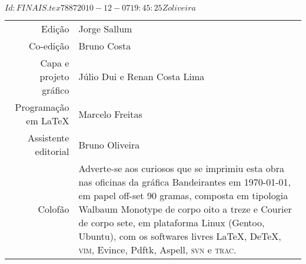 \SVN $Id: FINAIS.tex 7887 2010-12-07 19:45:25Z oliveira $


\newcommand{\putline}[2]{#1 & #2\\}

%
\ifodd\thepage\paginabranca\else\clearpage\fi
\pagebreak

\noindent\begin{tabular}{rp{}}
\small
\putline{Edição}{Jorge Sallum}
		\putline{Co-edição}{Bruno Costa}
		\putline{Capa e projeto gráfico}{Júlio Dui e Renan Costa Lima}
		\putline{Programação em LaTeX}{Marcelo Freitas}
		\putline{Assistente editorial}{Bruno Oliveira}
		\putline{Colofão}{Adverte-se aos curiosos que se
			imprimiu esta obra nas oficinas da gráfica
			Bandeirantes em \today, em papel 
			\mbox{off-set} 90 gramas,
			composta em tipologia Walbaum Monotype de 
			corpo oito a treze e Courier de corpo sete, 
			em plataforma Linux (Gentoo, Ubuntu), 
			com os softwares livres 
			\LaTeX, De\TeX, \textsc{vim}, Evince, Pdftk, 
			Aspell, \textsc{svn} e \textsc{trac}.}
\end{tabular}

